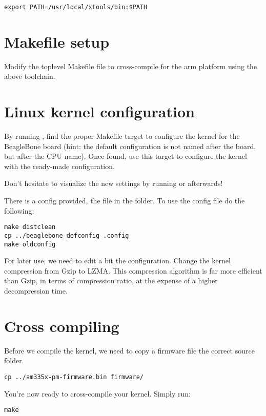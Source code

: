 \begin{verbatim}
export PATH=/usr/local/xtools/bin:$PATH
\end{verbatim}

\section{Makefile setup}

Modify the toplevel Makefile file to cross-compile for the arm
platform using the above toolchain.

\section{Linux kernel configuration}

By running , find the proper Makefile target to
configure the kernel for the BeagleBone board (hint: the default
configuration is not named after the board, but after the CPU
name). Once found, use this target to configure the kernel with the
ready-made configuration.

Don't hesitate to visualize the new settings by running
 or  afterwards!

There is a config provided, the  file in the  folder.
To use the config file do the following:

\begin{verbatim}
make distclean
cp ../beaglebone_defconfig .config
make oldconfig
\end{verbatim}

For later use, we need to edit a bit the configuration. Change the
kernel compression from Gzip to LZMA. This compression algorithm is
far more efficient than Gzip, in terms of compression ratio, at the
expense of a higher decompression time.

\section{Cross compiling}

Before we compile the kernel, we need to copy a firmware file the correct source folder.
\begin{verbatim}
cp ../am335x-pm-firmware.bin firmware/
\end{verbatim}

You're now ready to cross-compile your kernel. Simply run:

\begin{verbatim}
make
\end{verbatim}

